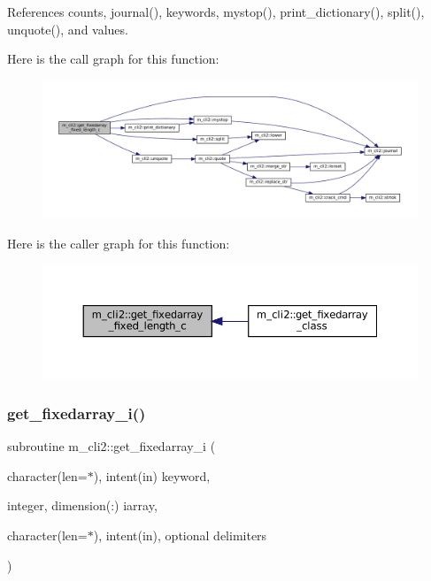 References counts, journal(), keywords, mystop(), print\+\_\+dictionary(), split(), unquote(), and values.

Here is the call graph for this function\+:\nopagebreak
\begin{figure}[H]
\begin{center}
\leavevmode
\includegraphics[width=350pt]{namespacem__cli2_a8000c5e05f6c84ba17350d4a00850a6a_cgraph}
\end{center}
\end{figure}
Here is the caller graph for this function\+:\nopagebreak
\begin{figure}[H]
\begin{center}
\leavevmode
\includegraphics[width=350pt]{namespacem__cli2_a8000c5e05f6c84ba17350d4a00850a6a_icgraph}
\end{center}
\end{figure}
\mbox{\label{namespacem__cli2_aa469ba94e6bb122c9bf30dd8642b693b}} 
\subsubsection{\texorpdfstring{get\+\_\+fixedarray\+\_\+i()}{get\_fixedarray\_i()}}
{\footnotesize\ttfamily subroutine m\+\_\+cli2\+::get\+\_\+fixedarray\+\_\+i (\begin{DoxyParamCaption}\item[{character(len=$\ast$), intent(in)}]{keyword,  }\item[{integer, dimension(\+:)}]{iarray,  }\item[{character(len=$\ast$), intent(in), optional}]{delimiters }\end{DoxyParamCaption})\hspace{0.3cm}{\ttfamily [private]}}



